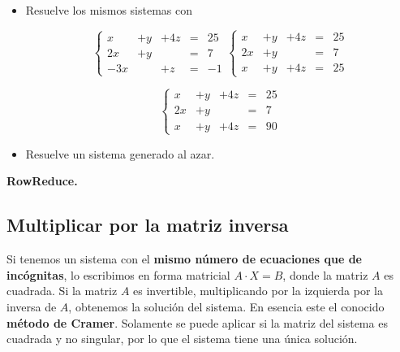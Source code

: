 \documentclass[a4paper,10pt, draft]{article}
\newcommand{\com}[1]{\textbf{\color{blue}{#1}}}
\newenvironment{ejer}{\begin{tcolorbox}[center title, title=Ejercicios,
fonttitle=\sffamily\bfseries,colback=blue!5,colframe=orange]}{\end{tcolorbox}}
\newenvironment{funciones}{\begin{tcolorbox}[center title, title=Nuevas funciones, fonttitle=\sffamily\bfseries, colback=green!5!white,colframe=red!75!black]}{\end{tcolorbox}\bigskip}
\begin{document}
\begin{ejer}

\begin{itemize}

\item Resuelve los mismos sistemas con \com{RowReduce}

\begin{small}
$$
\left\{
\begin{array}{rlccc}
x&+y&+4z & =& 25\\
2x&+y&  &   =&  7 \\
-3x& &+z & =&  -1
\end{array}\right.
 \left\{
\begin{array}{rlccc}
x&+y&+4z & =& 25\\
2x&+y&  &   =&  7 \\
x&+y&+4z & =& 25
\end{array}\right.
$$

$$
\left\{
\begin{array}{rlccc}
x&+y&+4z & =& 25\\
2x&+y&  &   =&  7 \\
x&+y&+4z & =& 90
\end{array}\right.
$$

\end{small}

\item Resuelve un sistema generado al azar.

\end{itemize}

\end{ejer}


\begin{funciones}

\textbf{RowReduce.}

\end{funciones}

 \newpage

\subsection{Multiplicar por la matriz inversa}

Si tenemos un sistema con el \textbf{mismo número de ecuaciones que de incógnitas}, lo escribimos en forma matricial $A\cdot X = B$, donde la matriz $A$ es cuadrada. Si la matriz $A$ es invertible, multiplicando por la izquierda por la inversa de $A$, obtenemos la solución del sistema. En esencia este el conocido \textbf{método de Cramer}. Solamente se puede aplicar si la matriz del sistema es cuadrada y no singular, por lo que el sistema tiene una única solución.
\end{document}
